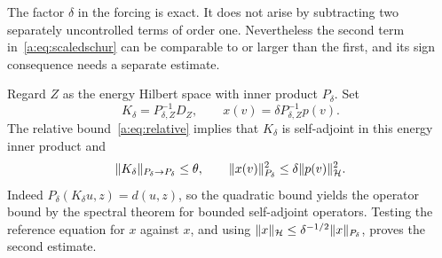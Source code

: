 \documentclass[11pt,a4paper]{article}
\numberwithin{equation}{section}
\theoremstyle{definition}\newtheorem{definition}[theorem]{Definition}
\theoremstyle{remark}\newtheorem{remark}[theorem]{Remark}
\newcommand{\Hh}{\mathcal H}\newcommand{\Hw}{\mathcal H}
\begin{document}
The factor $\delta$ in the forcing is exact. It does not arise by subtracting two separately uncontrolled terms of order one. Nevertheless the second term in~\eqref{a:eq:scaledschur} can be comparable to or larger than the first, and its sign consequence needs a separate estimate.

Regard $Z$ as the energy Hilbert space with inner product $P_\delta$. Set
\begin{equation}\label{a:eq:Kx}
 K_\delta=P_{\delta,Z}^{-1}D_Z,\qquad
 x(v)=\delta P_{\delta,Z}^{-1}p(v).
\end{equation}
The relative bound~\eqref{a:eq:relative} implies that $K_\delta$ is self-adjoint in this energy inner product and
\begin{equation}\label{a:eq:contraction}
 \norm{K_\delta}_{P_\delta\to P_\delta}\le\theta,
 \qquad \norm{x(v)}_{P_\delta}^2\le\delta\norm{p(v)}_{\Hh}^2.
\end{equation}
Indeed $P_\delta(K_\delta u,z)=d(u,z)$, so the quadratic bound yields the operator bound by the spectral theorem for bounded self-adjoint operators. Testing the reference equation for $x$ against $x$, and using
$\norm x_{\Hh}\le\delta^{-1/2}\norm x_{P_\delta}$, proves the second estimate.
\end{document}
